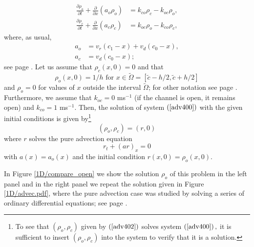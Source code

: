 \begin{align}
\frac{\partial\rho_{o}}{\partial t}+\frac{\partial}{\partial x}\left(
a_{o}\rho_{o}\right)   &  =k_{co}\rho_{c}-k_{oc}\rho_{o},\label{adv400}\\
\frac{\partial\rho_{c}}{\partial t}+\frac{\partial}{\partial x}\left(
a_{c}\rho_{c}\right)   &  =k_{oc}\rho_{o}-k_{co}\rho_{c},\nonumber
\end{align}
where, as usual,
\begin{align}
a_{o} &  =v_{r}(c_{1}-x)+v_{d}(c_{0}-x),\label{adv401}\\
a_{c} &  =v_{d}(c_{0}-x);\nonumber
\end{align}
see page \pageref{system_def_99}. Let us assume that $\rho_{c}(x,0)=0$ and
that
 \begin{equation} 
 \rho_o (x,0)=1/h \text{ for } x\in \tilde{\Omega} = [\tilde{c}-h/2,\tilde{c}+h/2 ] \label{adv_init_open}
 \end{equation}
and $\rho_o=0$ for values of $x$ outside the interval $\tilde{\Omega}$; 
for other notation see page \pageref{advectprobability}.  
Furthermore, we assume that $k_{oc}=0$ ms$^{-1}$ (if the channel is open, it
remains open) and $k_{co}=1$ ms$^{-1}$. Then, the solution of system  $\left(
\ref{adv400}\right)  $ with the given initial conditions is given
by\footnote{To see that $\left(  \rho_{o},\rho_{c}\right)  $ given by $\left(
\ref{adv402}\right)  $ solves system $\left(  \ref{adv400}\right)  ,$ it
is sufficient to insert $\left(  \rho_{o},\rho_{c}\right)  $ into the
system to verify that it is a solution. }%
\begin{equation}
\left(  \rho_{o},\rho_{c}\right)  =\left(  r,0\right)  \label{adv402}%
\end{equation}
where $r$ solves the pure advection equation%
\begin{equation}
r_{t}+\left(  ar\right)  _{x}=0\label{adv403}%
\end{equation}
with $a(x)=a_{o}(x)$ and the initial condition $r(x,0)=\rho_{o}(x,0).$ 

\bigskip 
In Figure \ref{1D/compare_open} we show the solution $\rho_{o}$ of this problem in
the left panel and in the right panel we repeat the solution given in Figure
\ref{1D/advec.pdf}, where the pure advection case was studied by solving a series of ordinary
differential equations; see page \pageref{1D/advec.pdf}. 


